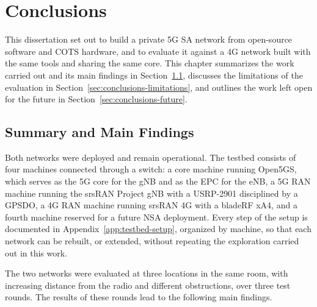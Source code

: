 %


\chapter{Conclusions}
\label{cha:conclusions}

This dissertation set out to build a private 5G \gls{SA} network from open-source software and \gls{COTS} hardware, and to evaluate it against a 4G network built with the same tools and sharing the same core. This chapter summarizes the work carried out and its main findings in Section~\ref{sec:conclusions-summary}, discusses the limitations of the evaluation in Section~\ref{sec:conclusions-limitations}, and outlines the work left open for the future in Section~\ref{sec:conclusions-future}.

\section{Summary and Main Findings}
\label{sec:conclusions-summary}

Both networks were deployed and remain operational. The testbed consists of four machines connected through a switch: a core machine running Open5GS, which serves as the 5G core for the \gls{gNB} and as the \gls{EPC} for the \gls{eNB}, a 5G \gls{RAN} machine running the srsRAN Project \gls{gNB} with a USRP-2901 disciplined by a \gls{GPSDO}, a 4G \gls{RAN} machine running srsRAN 4G with a bladeRF xA4, and a fourth machine reserved for a future \gls{NSA} deployment. Every step of the setup is documented in Appendix~\ref{app:testbed-setup}, organized by machine, so that each network can be rebuilt, or extended, without repeating the exploration carried out in this work.

The two networks were evaluated at three locations in the same room, with increasing distance from the radio and different obstructions, over three test rounds. The results of these rounds lead to the following main findings.

